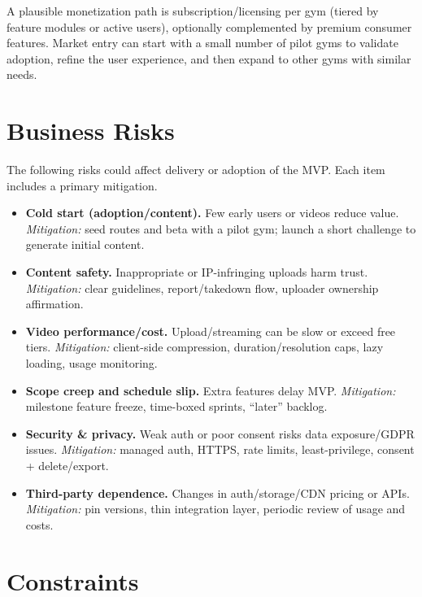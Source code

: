 \documentclass[12pt,a4paper]{report}
\renewcommand\_{\textunderscore\hspace{0pt}}
\begin{document}
A plausible monetization path is subscription/licensing per gym (tiered by feature modules or active users), optionally complemented by premium consumer features. Market entry can start with a small number of pilot gyms to validate adoption, refine the user experience, and then expand to other gyms with similar needs.

\section{Business Risks}

The following risks could affect delivery or adoption of the MVP. Each item includes a primary mitigation.

\begin{itemize}[noitemsep]
    \item \textbf{Cold start (adoption/content).} Few early users or videos reduce value. \emph{Mitigation:} seed routes and beta with a pilot gym; launch a short challenge to generate initial content.

    \item \textbf{Content safety.} Inappropriate or IP-infringing uploads harm trust. \emph{Mitigation:} clear guidelines, report/takedown flow, uploader ownership affirmation.

    \item \textbf{Video performance/cost.} Upload/streaming can be slow or exceed free tiers. \emph{Mitigation:} client-side compression, duration/resolution caps, lazy loading, usage monitoring.

    \item \textbf{Scope creep and schedule slip.} Extra features delay MVP. \emph{Mitigation:} milestone feature freeze, time-boxed sprints, ``later'' backlog.

    \item \textbf{Security \& privacy.} Weak auth or poor consent risks data exposure/GDPR issues. \emph{Mitigation:} managed auth, HTTPS, rate limits, least-privilege, consent + delete/export.

    \item \textbf{Third-party dependence.} Changes in auth/storage/CDN pricing or APIs. \emph{Mitigation:} pin versions, thin integration layer, periodic review of usage and costs.
\end{itemize}

\section{Constraints}
\end{document}
